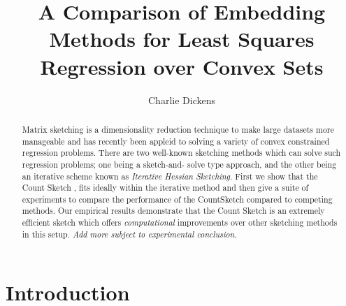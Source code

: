\documentclass[twoside]{article}
\title{A Comparison of Embedding Methods for Least Squares Regression
over Convex Sets}
\author{Charlie Dickens}
\date{}
\theoremstyle{definition}\newtheorem{thm}{Theorem}[section]
\theoremstyle{definition}\newtheorem{mydef}[thm]{Definition}
\theoremstyle{definition}\newtheorem{rem}[thm]{Remark}
\theoremstyle{definition}\newtheorem{prop}[thm]{Proposition}
\theoremstyle{definition}\newtheorem{example}[thm]{Example}
\theoremstyle{definition}\newtheorem{claim}[thm]{Claim}
\theoremstyle{definition}\newtheorem{Qu}[thm]{Question}
\theoremstyle{definition}\newtheorem{Lemma}[thm]{Lemma}
\theoremstyle{definition}\newtheorem{Cor}[thm]{Corollary}
\theoremstyle{definition}\newtheorem{Fact}[]{Fact}
\begin{document}
\maketitle

%

%





\begin{abstract}
  Matrix sketching is a dimensionality reduction technique to make large datasets
  more manageable and has recently been appleid to solving a variety of
  convex constrained regression problems.
  There are two well-known sketching methods which can solve such
  regression problems; one being a sketch-and-
  solve type approach, and the other being an iterative scheme known as \textit{
  Iterative Hessian Sketching}.
  First we show that the
  Count Sketch \cite{clarkson2013low}, fits ideally within the iterative method
  and then give a suite of experiments to compare the performance of
  the CountSketch compared to competing methods.
  Our empirical results demonstrate that the Count Sketch is an extremely efficient
  sketch which offers \textit{computational} improvements over other sketching
  methods in this setup.
  \textit{Add more subject to experimental conclusion.}
\end{abstract}

\section{Introduction} \label{sec: intro}

\end{document}
